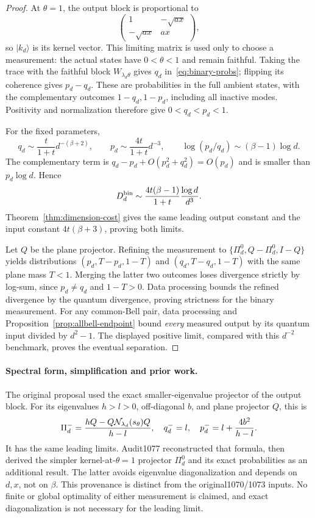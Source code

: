 \begin{proof}
At $\theta=1$, the output block is proportional to
\[
 \begin{pmatrix}1&-\sqrt{ax}\\-\sqrt{ax}&ax\end{pmatrix},
\]
so $|k_d\rangle$ is its kernel vector. This limiting matrix is used only to choose a measurement: the actual states have $0<\theta<1$ and remain faithful. Taking the trace with the faithful block $W_{\lambda_d\theta}$ gives $q_d$ in~\eqref{eq:binary-probs}; flipping its coherence gives $p_d-q_d$. These are probabilities in the full ambient states, with the complementary outcomes $1-q_d,1-p_d$, including all inactive modes. Positivity and normalization therefore give $0<q_d<p_d<1$.

For the fixed parameters,
\[
 q_d\sim\frac{t}{1+t}d^{-(\beta+2)},\qquad
 p_d\sim\frac{4t}{1+t}d^{-3},\qquad
 \log(p_d/q_d)\sim(\beta-1)\log d.
\]
The complementary term is $q_d-p_d+O(p_d^2+q_d^2)=O(p_d)$ and is smaller than $p_d\log d$. Hence
\[
 D_d^{\rm bin}\sim\frac{4t(\beta-1)}{1+t}\frac{\log d}{d^3}.
\]
Theorem~\ref{thm:dimension-cost} gives the same leading output constant and the input constant $4t(\beta+3)$, proving both limits.

Let $Q$ be the plane projector. Refining the measurement to $\{\Pi_d^0,Q-\Pi_d^0,I-Q\}$ yields distributions $(p_d,T-p_d,1-T)$ and $(q_d,T-q_d,1-T)$ with the same plane mass $T<1$. Merging the latter two outcomes loses divergence strictly by log-sum, since $p_d\ne q_d$ and $1-T>0$. Data processing bounds the refined divergence by the quantum divergence, proving strictness for the binary measurement. For any common-Bell pair, data processing and Proposition~\ref{prop:allbell-endpoint} bound \emph{every} measured output by its quantum input divided by $d^2-1$. The displayed positive limit, compared with this $d^{-2}$ benchmark, proves the eventual separation.
\end{proof}

\paragraph{Spectral form, simplification and prior work.}
The original proposal used the exact smaller-eigenvalue projector of the output block. For its eigenvalues $h>l>0$, off-diagonal $b$, and plane projector $Q$, this is
\[
 \Pi_d^- =\frac{hQ-Q\mathcal N_{\lambda_d}(s_\theta)Q}{h-l},
 \quad q_d^-=l,\quad p_d^-=l+\frac{4b^2}{h-l}.
\]
It has the same leading limits. Audit1077 reconstructed that formula, then derived the simpler kernel-at-$\theta=1$ projector $\Pi_d^0$ and its exact probabilities as an additional result. The latter avoids eigenvalue diagonalization and depends on $d,x$, not on $\beta$. This provenance is distinct from the original1070/1073 inputs. No finite or global optimality of either measurement is claimed, and exact diagonalization is not necessary for the leading limit.

